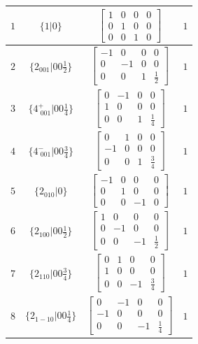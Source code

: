 \documentclass[fleqn,8pt]{jsarticle}
\begin{document}
\begin{longtable}{cccc}
$ 1 $ & $ \{1|0\} $ & $ \begin{bmatrix} 1 & 0 & 0 & 0 \\ 0 & 1 & 0 & 0 \\ 0 & 0 & 1 & 0 \end{bmatrix} $ & $ 1 $ \\ \hline
$ 2 $ & $ \{2{}_{001}|0 0 \frac{1}{2}\} $ & $ \begin{bmatrix} -1 & 0 & 0 & 0 \\ 0 & -1 & 0 & 0 \\ 0 & 0 & 1 & \frac{1}{2} \end{bmatrix} $ & $ 1 $ \\ \hline
$ 3 $ & $ \{4^{+}_{\,\,001}|0 0 \frac{1}{4}\} $ & $ \begin{bmatrix} 0 & -1 & 0 & 0 \\ 1 & 0 & 0 & 0 \\ 0 & 0 & 1 & \frac{1}{4} \end{bmatrix} $ & $ 1 $ \\ \hline
$ 4 $ & $ \{4^{-}_{\,\,001}|0 0 \frac{3}{4}\} $ & $ \begin{bmatrix} 0 & 1 & 0 & 0 \\ -1 & 0 & 0 & 0 \\ 0 & 0 & 1 & \frac{3}{4} \end{bmatrix} $ & $ 1 $ \\ \hline
$ 5 $ & $ \{2{}_{010}|0\} $ & $ \begin{bmatrix} -1 & 0 & 0 & 0 \\ 0 & 1 & 0 & 0 \\ 0 & 0 & -1 & 0 \end{bmatrix} $ & $ 1 $ \\ \hline
$ 6 $ & $ \{2{}_{100}|0 0 \frac{1}{2}\} $ & $ \begin{bmatrix} 1 & 0 & 0 & 0 \\ 0 & -1 & 0 & 0 \\ 0 & 0 & -1 & \frac{1}{2} \end{bmatrix} $ & $ 1 $ \\ \hline
$ 7 $ & $ \{2{}_{110}|0 0 \frac{3}{4}\} $ & $ \begin{bmatrix} 0 & 1 & 0 & 0 \\ 1 & 0 & 0 & 0 \\ 0 & 0 & -1 & \frac{3}{4} \end{bmatrix} $ & $ 1 $ \\ \hline
$ 8 $ & $ \{2{}_{1-10}|0 0 \frac{1}{4}\} $ & $ \begin{bmatrix} 0 & -1 & 0 & 0 \\ -1 & 0 & 0 & 0 \\ 0 & 0 & -1 & \frac{1}{4} \end{bmatrix} $ & $ 1 $ \\
\end{longtable}
\end{document}
